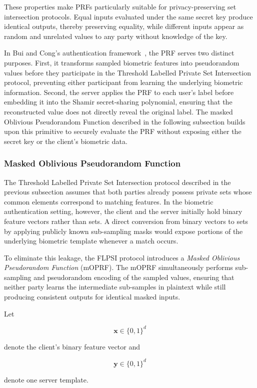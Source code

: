 \documentclass[11pt,a4paper]{article}
\begin{document}
These properties make PRFs particularly suitable for privacy-preserving
set intersection protocols. Equal inputs evaluated under the same secret
key produce identical outputs, thereby preserving equality, while
different inputs appear as random and unrelated values to any party
without knowledge of the key.

In Bui and Cong's authentication framework~\cite{BuiCong25}, the PRF serves two distinct
purposes. First, it transforms sampled biometric features into
pseudorandom values before they participate in the Threshold Labelled
Private Set Intersection protocol, preventing either participant from
learning the underlying biometric information. Second, the server applies
the PRF to each user's label before embedding it into the Shamir
secret-sharing polynomial, ensuring that the reconstructed value does not
directly reveal the original label. The masked Oblivious Pseudorandom
Function described in the following subsection builds upon this primitive
to securely evaluate the PRF without exposing either the secret key or
the client's biometric data.
\subsubsection{Masked Oblivious Pseudorandom Function}

The Threshold Labelled Private Set Intersection protocol described in the previous subsection assumes that both parties already possess private sets whose common elements correspond to matching features. In the biometric authentication setting, however, the client and the server initially hold binary feature vectors rather than sets. A direct conversion from binary vectors to sets by applying publicly known sub-sampling masks would expose portions of the underlying biometric template whenever a match occurs.

To eliminate this leakage, the FLPSI protocol introduces a \emph{Masked Oblivious Pseudorandom Function} (mOPRF). The mOPRF simultaneously performs sub-sampling and pseudorandom encoding of the sampled values, ensuring that neither party learns the intermediate sub-samples in plaintext while still producing consistent outputs for identical masked inputs.

Let

\[
\mathbf{x}
\in
\{0,1\}^{d}
\]

denote the client's binary feature vector and

\[
\mathbf{y}
\in
\{0,1\}^{d}
\]

denote one server template.
\end{document}
